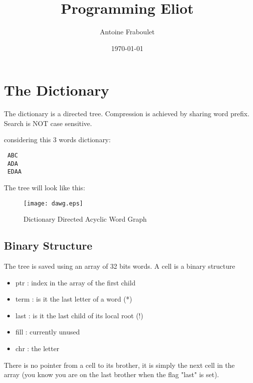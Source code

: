 \documentclass[dvips]{article}
\title{Programming Eliot}
\date{\today}
\author{Antoine Fraboulet}
\begin{document}
\maketitle

\section{The Dictionary}

 The dictionary is a directed tree. Compression is achieved by
 sharing word prefix. Search is NOT case sensitive. 
 
 considering this 3 words dictionary:

\begin{verbatim}
 ABC
 ADA
 EDAA
\end{verbatim}

 The tree will look like this:

\begin{figure}[htb]
\begin{center}
    \texttt{[image: dawg.eps]}
    \caption{Dictionary Directed Acyclic Word Graph}
    \label{fig:dawg}
\end{center}
\end{figure}

\subsection{Binary Structure}

 The tree is saved using an array of 32 bits words.
 A cell is a binary structure 

\begin{itemize}
\item ptr  : index in the array of the first child
\item term : is it the last letter of a word (*)
\item last : is it the last child of its local root (!)
\item fill : currently unused
\item chr  : the letter
\end{itemize}

 There is no pointer from a cell to its brother, it is simply the
 next cell in the array (you know you are on the last brother when
 the flag "last" is set).
\end{document}
